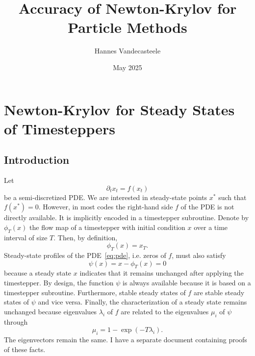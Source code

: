 \documentclass{article}
\title{Accuracy of Newton-Krylov for Particle Methods}
\author{Hannes Vandecasteele}
\date{May 2025}
\begin{document}
\maketitle

\section{Newton-Krylov for Steady States of Timesteppers}
\subsection{Introduction}
Let 
\begin{equation} \label{eq:pde}
    \partial_t x_t = f\left(x_t\right)
\end{equation}
be a semi-discretized PDE. We are interested in steady-state points $x^*$ such that $f(x^*)=0$. However, in most codes the right-hand side $f$ of the PDE is not directly available. It is implicitly encoded in a timestepper subroutine. Denote by $\phi_T(x)$ the flow map of a timestepper with initial condition $x$ over a time interval of size $T$. Then, by definition, 
\begin{equation*} 
    \phi_T(x) = x_T.
\end{equation*}
Steady-state profiles of the PDE~\eqref{eq:pde}, i.e. zeros of $f$, must also satisfy
\begin{equation}
    \psi(x) = x - \phi_T(x) = 0
\end{equation}
because a steady state $x$ indicates that it remains unchanged after applying the timestepper. By design, the function $\psi$ is always available because it is based on a timestepper subroutine. Furthermore, stable steady states of $f$ are stable steady states of $\psi$ and vice versa. Finally, the characterization of a steady state remains unchanged because eigenvalues $\lambda_i$ of $f$ are related to the eigenvalues $\mu_i$ of $\psi$ through
\begin{equation}
    \mu_i = 1 - \exp\left(-T \lambda_i\right).
\end{equation}
The eigenvectors remain the same. I have a separate document containing proofs of these facts.
\end{document}
